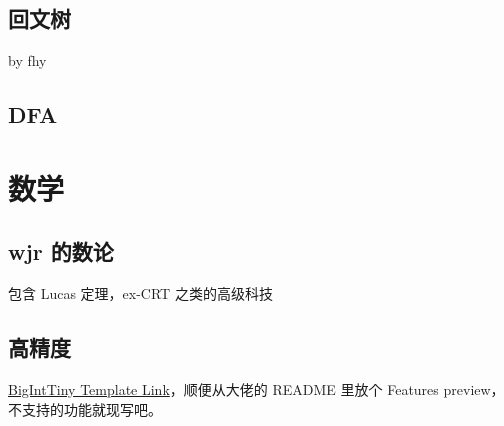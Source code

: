 \documentclass[12pt]{article}
\begin{document}
\newpage

\subsection{回文树}

by fhy



\newpage

\subsection{DFA}



\newpage

{\centering\section{数学}}

\subsection{wjr 的数论}

包含 Lucas 定理，ex-CRT 之类的高级科技



\newpage

\subsection{高精度}

\href{https://github.com/Baobaobear/MiniBigInteger/blob/main/bigint_tiny.h}{BigIntTiny Template Link}，顺便从大佬的 README 里放个 Features preview，不支持的功能就现写吧。
\end{document}
